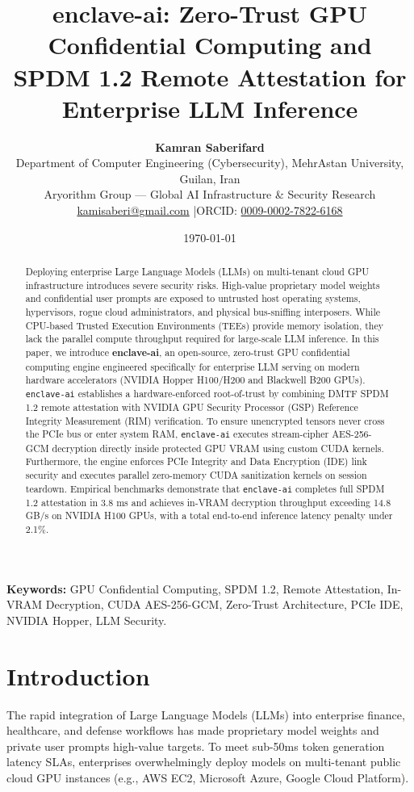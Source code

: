 \documentclass[11pt,a4paper]{article}
\title{\Large\bfseries enclave-ai: Zero-Trust GPU Confidential Computing and SPDM 1.2 Remote Attestation for Enterprise LLM Inference}
\author{
    \textbf{Kamran Saberifard}\\[4pt]
    Department of Computer Engineering (Cybersecurity), MehrAstan University, Guilan, Iran\\
    Aryorithm Group — Global AI Infrastructure \& Security Research\\
    \href{mailto:kamisaberi@gmail.com}{kamisaberi@gmail.com} \quad|\quad ORCID: \href{https://orcid.org/0009-0002-7822-6168}{0009-0002-7822-6168}
}
\date{\today}
\begin{document}
\maketitle

\begin{abstract}
\noindent Deploying enterprise Large Language Models (LLMs) on multi-tenant cloud GPU infrastructure introduces severe security risks. High-value proprietary model weights and confidential user prompts are exposed to untrusted host operating systems, hypervisors, rogue cloud administrators, and physical bus-sniffing interposers. While CPU-based Trusted Execution Environments (TEEs) provide memory isolation, they lack the parallel compute throughput required for large-scale LLM inference. In this paper, we introduce \textbf{enclave-ai}, an open-source, zero-trust GPU confidential computing engine engineered specifically for enterprise LLM serving on modern hardware accelerators (NVIDIA Hopper H100/H200 and Blackwell B200 GPUs). \texttt{enclave-ai} establishes a hardware-enforced root-of-trust by combining DMTF SPDM 1.2 remote attestation with NVIDIA GPU Security Processor (GSP) Reference Integrity Measurement (RIM) verification. To ensure unencrypted tensors never cross the PCIe bus or enter system RAM, \texttt{enclave-ai} executes stream-cipher AES-256-GCM decryption directly inside protected GPU VRAM using custom CUDA kernels. Furthermore, the engine enforces PCIe Integrity and Data Encryption (IDE) link security and executes parallel zero-memory CUDA sanitization kernels on session teardown. Empirical benchmarks demonstrate that \texttt{enclave-ai} completes full SPDM 1.2 attestation in 3.8 ms and achieves in-VRAM decryption throughput exceeding 14.8 GB/s on NVIDIA H100 GPUs, with a total end-to-end inference latency penalty under 2.1\%.
\end{abstract}

\vspace{6pt}
\noindent\textbf{Keywords:} GPU Confidential Computing, SPDM 1.2, Remote Attestation, In-VRAM Decryption, CUDA AES-256-GCM, Zero-Trust Architecture, PCIe IDE, NVIDIA Hopper, LLM Security.

\hr

\section{Introduction}
The rapid integration of Large Language Models (LLMs) into enterprise finance, healthcare, and defense workflows has made proprietary model weights and private user prompts high-value targets. To meet sub-50ms token generation latency SLAs, enterprises overwhelmingly deploy models on multi-tenant public cloud GPU instances (e.g., AWS EC2, Microsoft Azure, Google Cloud Platform).
\end{document}
